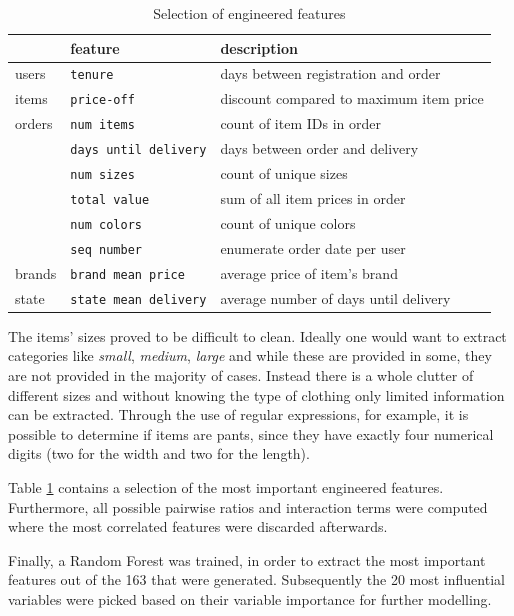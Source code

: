 \begin{table}
\centering
\caption{Selection of engineered features}
\label{features-tab}
\begin{tabular}{@{}lll@{}}
       & feature             & description                           \\ \midrule
users  & \texttt{tenure}              & days between registration and order        \\
items  & \texttt{price-off}           & discount compared to maximum item price    \\
orders & \texttt{num items}           & count of item IDs in order                 \\
       & \texttt{days until delivery} & days between order and delivery            \\
       & \texttt{num sizes}           & count of unique sizes                      \\
       & \texttt{total value}         & sum of all item prices in order            \\
       & \texttt{num colors}          & count of unique colors                     \\
       & \texttt{seq number}          & enumerate order date per user              \\
brands & \texttt{brand mean price}    & average price of item's brand              \\
state  & \texttt{state mean delivery} & average number of days until delivery
\end{tabular}
\end{table}

The items' sizes proved to be difficult to clean. Ideally one would want to extract categories like \textit{small}, \textit{medium}, \textit{large} and while these are provided in some, they are not provided in the majority of cases. Instead there is a whole clutter of different sizes and without knowing the type of clothing only limited information can be extracted. Through the use of regular expressions, for example, it is possible to determine if items are pants, since they have exactly four numerical digits (two for the width and two for the length).

Table \ref{features-tab} contains a selection of the most important engineered features. Furthermore, all possible pairwise ratios and interaction terms were computed where the most correlated features were discarded afterwards.

Finally, a Random Forest was trained, in order to extract the most important features out of the 163 that were generated. Subsequently the 20 most influential variables were picked based on their variable importance for further modelling.